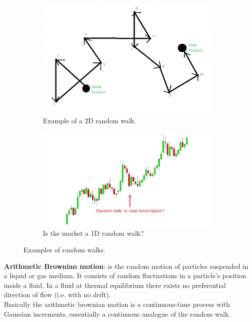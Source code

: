 \begin{figure}[H]
    \centering
    \begin{subfigure}{0.47\textwidth}
        \centering
        \includegraphics[width=\linewidth]{img/random_walk_1.png}
        \caption{Example of a 2D random walk.}
        \label{fig:sub1}
    \end{subfigure}
    \hfill
    \begin{subfigure}{0.47\textwidth}
        \centering
        \includegraphics[width=\linewidth]{img/random_walk_2.png}
        \caption{Is the market a 1D random walk?}
        \label{fig:sub2}
    \end{subfigure}
    \caption{Examples of random walks.}
    \label{fig:due_immagini}
\end{figure}

\textbf{Arithmetic Brownian motion}: is the random motion of particles suspended in a liquid or gas medium. It consists of random fluctuations in a particle's position inside a fluid. In a fluid at thermal equilibrium there exists no preferential direction of flow (i.e. with no drift). \\
Basically the arithmetic brownian motion is a continuous-time process with Gaussian increments, essentially a continuous analogue of the random walk.\\

